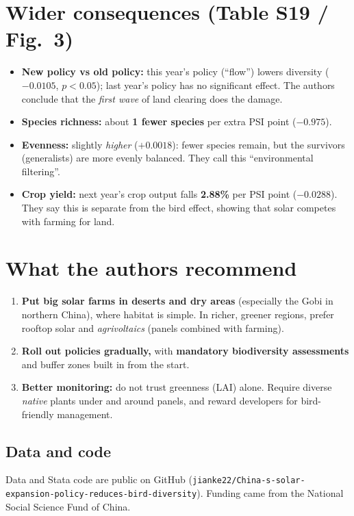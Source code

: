 \documentclass[11pt]{article}
\begin{document}
\section{Wider consequences (Table S19 / Fig.\ 3)}
\begin{itemize}
\item \textbf{New policy vs old policy:} this year's policy (``flow'') lowers diversity ($-0.0105$, $p<0.05$); last year's policy has no significant effect. The authors conclude that the \emph{first wave} of land clearing does the damage.
\item \textbf{Species richness:} about \textbf{1 fewer species} per extra PSI point ($-0.975$).
\item \textbf{Evenness:} slightly \emph{higher} ($+0.0018$): fewer species remain, but the survivors (generalists) are more evenly balanced. They call this ``environmental filtering''.
\item \textbf{Crop yield:} next year's crop output falls \textbf{2.88\%} per PSI point ($-0.0288$). They say this is separate from the bird effect, showing that solar competes with farming for land.
\end{itemize}

\section{What the authors recommend}
\begin{enumerate}
\item \textbf{Put big solar farms in deserts and dry areas} (especially the Gobi in northern China), where habitat is simple. In richer, greener regions, prefer rooftop solar and \emph{agrivoltaics} (panels combined with farming).
\item \textbf{Roll out policies gradually,} with \textbf{mandatory biodiversity assessments} and buffer zones built in from the start.
\item \textbf{Better monitoring:} do not trust greenness (LAI) alone. Require diverse \emph{native} plants under and around panels, and reward developers for bird-friendly management.
\end{enumerate}

\subsection{Data and code}
Data and Stata code are public on GitHub (\texttt{jianke22/China-s-solar-expansion-policy-reduces-bird-diversity}). Funding came from the National Social Science Fund of China.
\end{document}
